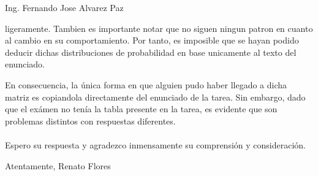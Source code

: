 \documentclass{letter}
\begin{document}
\begin{letter}{Ing. Fernando Jose Alvarez Paz}
\begin {itemize}
    ligeramente. Tambien es importante notar que no siguen 
    ningun patron en cuanto al cambio en su comportamiento. 
    Por tanto, es imposible que se hayan podido deducir dichas 
    distribuciones de probabilidad en base unicamente al texto del 
    enunciado.
  \end {itemize}
  En consecuencia, la única forma en que alguien pudo haber llegado
  a dicha matriz es copiandola directamente del enunciado de la tarea.
  Sin embargo, dado que el exámen no tenía la tabla presente en la 
  tarea, es evidente que son problemas distintos con respuestas 
  diferentes. \\\\
  Espero su respuesta y agradezco inmensamente su comprensión y 
  consideración. 
  \closing{Atentamente, Renato Flores}

\end{letter}
\end{document}

